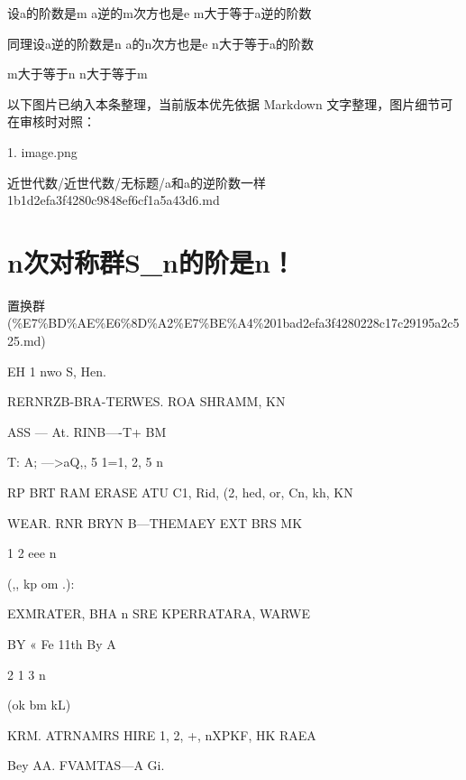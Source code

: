 \begin{note}[a和a的逆阶数一样]

设a的阶数是m a逆的m次方也是e m大于等于a逆的阶数

同理设a逆的阶数是n a的n次方也是e n大于等于a的阶数

m大于等于n n大于等于m

\end{note}

\begin{note}[关联图片]
以下图片已纳入本条整理，当前版本优先依据 Markdown 文字整理，图片细节可在审核时对照：

1. image.png\\

\end{note}

\begin{note}[来源路径]

近世代数/近世代数/无标题/a和a的逆阶数一样 1b1d2efa3f4280c9848ef6cf1a5a43d6.md

\end{note}

\section*{n次对称群S\_n的阶是n！}

\begin{note}[来源上级主题]

置换群 (\%E7\%BD\%AE\%E6\%8D\%A2\%E7\%BE\%A4\%201bad2efa3f4280228c17c29195a2c525.md)

\end{note}

\begin{note}

EH 1 nwo S, Hen.

RERNRZB-BRA-TERWES. ROA SHRAMM, KN

ASS — At. RINB—-T+ BM

T: A; —>aQ,, 5  1=1, 2, 5 n

RP BRT RAM ERASE ATU C1, Rid, (2, hed, or, Cn, kh, KN

WEAR. RNR BRYN B—THEMAEY EXT BRS MK

1  2  eee  n

(,, kp om .):

EXMRATER, BHA n SRE KPERRATARA, WARWE

BY « Fe 11th By A

2 1 3  n

(ok bm kL)

KRM. ATRNAMRS HIRE 1, 2, +, nXPKF, HK RAEA

Bey AA. FVAMTAS—A Gi.

\end{note}

